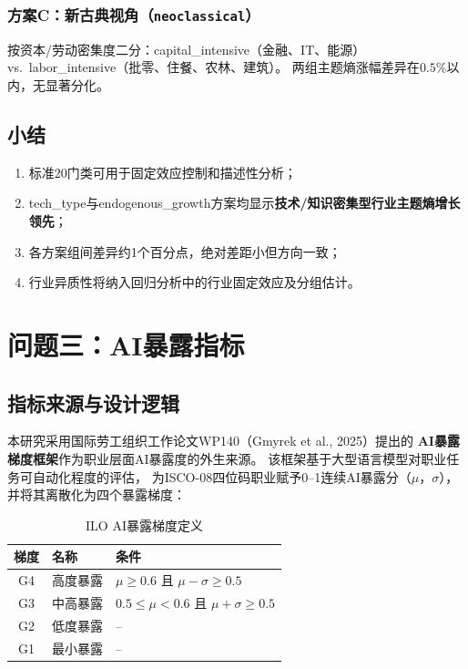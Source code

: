 \documentclass[12pt,a4paper]{ctexart}
\begin{document}
\subsubsection{方案C：新古典视角（\texttt{neoclassical}）}

按资本/劳动密集度二分：capital\_intensive（金融、IT、能源）
vs.\ labor\_intensive（批零、住餐、农林、建筑）。
两组主题熵涨幅差异在$0.5\%$以内，无显著分化。

\subsection{小结}

\begin{enumerate}
\item 标准20门类可用于固定效应控制和描述性分析；
\item tech\_type与endogenous\_growth方案均显示\textbf{技术/知识密集型行业主题熵增长领先}；
\item 各方案组间差异约1个百分点，绝对差距小但方向一致；
\item 行业异质性将纳入回归分析中的行业固定效应及分组估计。
\end{enumerate}


\section{问题三：AI暴露指标}
\label{sec:ai_exposure}

\subsection{指标来源与设计逻辑}

本研究采用国际劳工组织工作论文WP140（Gmyrek et al., 2025）提出的
\textbf{AI暴露梯度框架}作为职业层面AI暴露度的外生来源。
该框架基于大型语言模型对职业任务可自动化程度的评估，
为ISCO-08四位码职业赋予0--1连续AI暴露分（$\mu$，$\sigma$），
并将其离散化为四个暴露梯度：

\begin{table}[h!]
\centering
\caption{ILO AI暴露梯度定义}
\label{tab:ilo_gradients}
\begin{tabular}{cll}
\toprule
梯度 & 名称 & 条件 \\
\midrule
G4 & 高度暴露 & $\mu \geq 0.6$ 且 $\mu - \sigma \geq 0.5$ \\
G3 & 中高暴露 & $0.5 \leq \mu < 0.6$ 且 $\mu + \sigma \geq 0.5$ \\
G2 & 低度暴露 & -- \\
G1 & 最小暴露 & -- \\
\bottomrule
\end{tabular}
\end{table}
\end{document}
